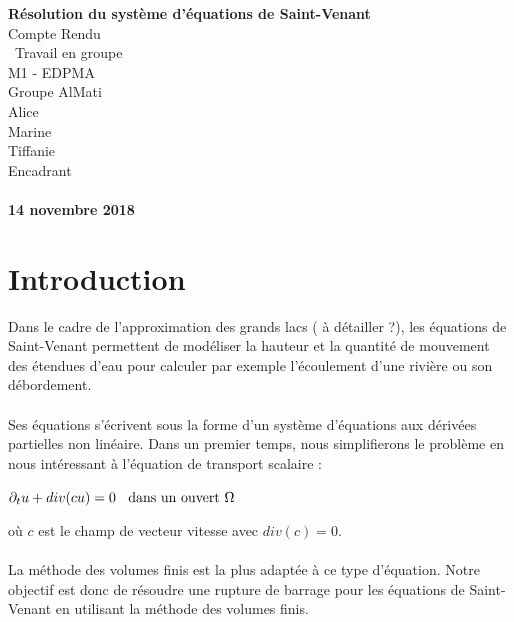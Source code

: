 \documentclass[12pt]{article}
\begin{document}
\begin{titlepage}
\begin{center}


\vspace{3cm}

\huge
\textbf{Résolution du système d'équations de Saint-Venant} \\
\vspace{0.7cm}
\Large
Compte Rendu\\
\ Travail en groupe \\
\large
\vspace{0.7cm}
M1 - EDPMA\\
Groupe AlMati\\
\vspace{0.7cm}
Alice  \\ Marine  \\ Tiffanie  \\
\vspace{0.7cm}
Encadrant\\
\\
\vspace{2cm}
\Large
\textbf{14 novembre 2018}
\end{center}
\end{titlepage}

\normalsize

\newpage
\tableofcontents
\newpage
\section{Introduction}

\noindent Dans le cadre de l'approximation des grands lacs ( à détailler ?), les équations de Saint-Venant permettent de modéliser la hauteur et la quantité de mouvement des étendues d'eau pour calculer par exemple l'écoulement d'une rivière ou son débordement. 
\\
\\Ses équations s'écrivent sous la forme d'un système d'équations aux dérivées partielles non linéaire. Dans un premier temps, nous simplifierons le problème en nous intéressant à l'équation de transport scalaire :

\begin{center}
    $\partial_t u + div(cu) = 0 \text{ \: dans un ouvert } \Omega $
\end{center}

\noindent où $c$ est le champ de vecteur vitesse avec $div(c)=0$. 
\\
\\La méthode des volumes finis est la plus adaptée à ce type d'équation. Notre objectif est donc de résoudre une rupture de barrage pour les équations de Saint-Venant en utilisant la méthode des volumes finis.
\end{document}

